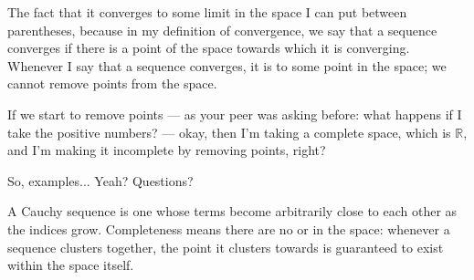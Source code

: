 \begin{speech}[00:52:59 - 00:53:56]
The fact that it converges to some limit in the space I can put between parentheses, because in my definition of convergence, we say that a sequence converges if there is a point of the space towards which it is converging. Whenever I say that a sequence converges, it is to some point in the space; we cannot remove points from the space.

If we start to remove points --- as your peer was asking before: what happens if I take the positive numbers? --- okay, then I'm taking a complete space, which is $\mathbb{R}$, and I'm making it incomplete by removing points, right?

 So, examples... Yeah? Questions?
\end{speech}

\begin{content}


\begin{steps}
A Cauchy sequence is one whose terms become arbitrarily close to each other as the indices grow. Completeness means there are no  or  in the space: whenever a sequence clusters together, the point it clusters towards is guaranteed to exist within the space itself.
\end{steps}
\end{content}

